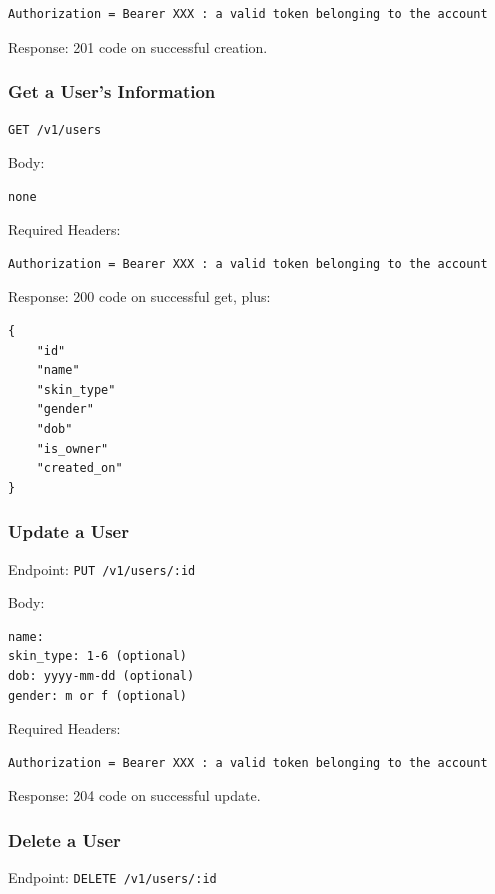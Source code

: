 \documentclass[12pt,openany,a4paper]{book}
\begin{document}
\begin{verbatim}
Authorization = Bearer XXX : a valid token belonging to the account
\end{verbatim}

Response: 201 code on successful creation.

\subsubsection{Get a User's Information}

\verb|GET /v1/users|

Body:

\begin{verbatim}
none
\end{verbatim}

Required Headers: 

\begin{verbatim}
Authorization = Bearer XXX : a valid token belonging to the account
\end{verbatim}

Response: 200 code on successful get, plus:

\begin{verbatim}
{
	"id"
	"name"
	"skin_type"
	"gender"
	"dob"
	"is_owner"
	"created_on"
}
\end{verbatim}

\subsubsection{Update a User}

Endpoint: \verb|PUT /v1/users/:id|

Body:
\begin{verbatim}
name:
skin_type: 1-6 (optional)
dob: yyyy-mm-dd (optional)
gender: m or f (optional)
\end{verbatim}

Required Headers: 

\begin{verbatim}
Authorization = Bearer XXX : a valid token belonging to the account
\end{verbatim}

Response: 204 code on successful update.

\subsubsection{Delete a User}

Endpoint: \verb|DELETE /v1/users/:id|
\end{document}

